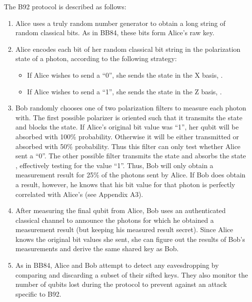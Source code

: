 \documentclass[conference]{IEEEtran}
\begin{document}
The B92 protocol is described as follows\cite{B92}:
\begin{enumerate}
\item Alice uses a truly random number generator to obtain a long string of random classical bits. As in BB84, these bits form Alice's raw key.
\item Alice encodes each bit of her random classical bit string in the polarization state of a photon, according to the following strategy:
  \begin{itemize}
  \item If Alice wishes to send a ``0'', she sends the  state in the X basis, \ket{\uparrow}.
  \item If Alice wishes to send a ``1'', she sends the  state in the Z basis, \ket{\nwarrow}.
  \end{itemize}
\item Bob randomly chooses one of two polarization filters to measure each photon with. The first possible polarizer is oriented such that it transmits the state \ket{\nearrow} and blocks the state\ket{\nwarrow}. If Alice's original bit value was ``1'', her qubit will be absorbed with 100\% probability. Otherwise it will be either transmitted or absorbed with 50\% probability. Thus this filter can only test whether Alice sent a ``0''. The other possible filter transmits the state \ket{\rightarrow} and absorbs the state \ket{\uparrow}, effectively testing for the value ``1''. Thus, Bob will only obtain a measurement result for 25\% of the photons sent by Alice. If Bob does obtain a result, however, he knows that his bit value for that photon is perfectly correlated with Alice's (see Appendix A3).
\item After measuring the final qubit from Alice, Bob uses an authenticated classical channel to announce the photons for which he obtained a measurement result (but keeping his measured result secret). Since Alice knows the original bit values she sent, she can figure out the results of Bob's measurements and derive the same shared key as Bob.
\item As in BB84, Alice and Bob attempt to detect any eavesdropping by comparing and discarding a subset of their sifted keys. They also monitor the number of qubits lost during the protocol to prevent against an attack specific to B92.\\
\end{enumerate}
\end{document}

